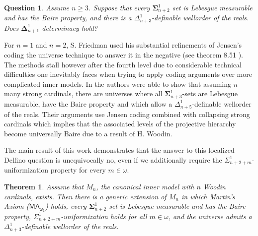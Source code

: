 \documentclass[a4paper,11pt]{article}
\newtheorem{theorem}{Theorem}[section]
\newtheorem{question}{Question}
\newcommand{\MA}{\mathsf{MA_{\omega_1}}}
\begin{document}
\begin{question}
    Assume $n \ge 3$. Suppose that every $\boldsymbol{\Sigma}^1_{n+2}$ set is Lebesgue measurable and has the Baire property, and there is a $\Delta^1_{n+3}$-definable wellorder of the reals. Does $\boldsymbol{\Delta}^1_{n+1}$-determinacy hold?
\end{question}

For $n=1$ and $n=2$, S. Friedman used his substantial refinements of Jensen's coding the universe technique to answer it in the negative (see theorem 8.51 \cite{friedman2011fine}). The methods stall however after the fourth level due to considerable technical difficulties one inevitably faces when trying to apply coding arguments over more complicated inner models. In \cite{friedman2003universally} the authors were able to show that assuming $n$ many strong cardinals, there are universes where all $\boldsymbol{\Sigma}^1_{n+3}$-sets are Lebesgue measurable, have the Baire property and which allow a $\Delta^1_{n+5}$-definable wellorder of the reals. Their arguments use Jensen coding combined with collapsing strong cardinals which implies that the associated levels of the projective hierarchy become universally Baire due to a result of H. Woodin.


The main result of this work demonstrates that the answer to this localized Delfino question is unequivocally no, even if we additionally require the $\Sigma^1_{n+2+m}$-uniformization property for every $m\in \omega$. 

\begin{theorem}
    Assume that $M_n$, the canonical inner model with $n$ Woodin cardinals, exists. Then there is a generic extension of $M_n$ in which Martin's Axiom ($\MA$) holds, every $\boldsymbol{\Sigma}^1_{n+2}$ set is Lebesgue measurable and has the Baire property, $\Sigma^1_{n+2+m}$-uniformization holds for all $m \in \omega$, and the universe admits a $\Delta^1_{n+3}$-definable wellorder of the reals.
\end{theorem}
\end{document}
